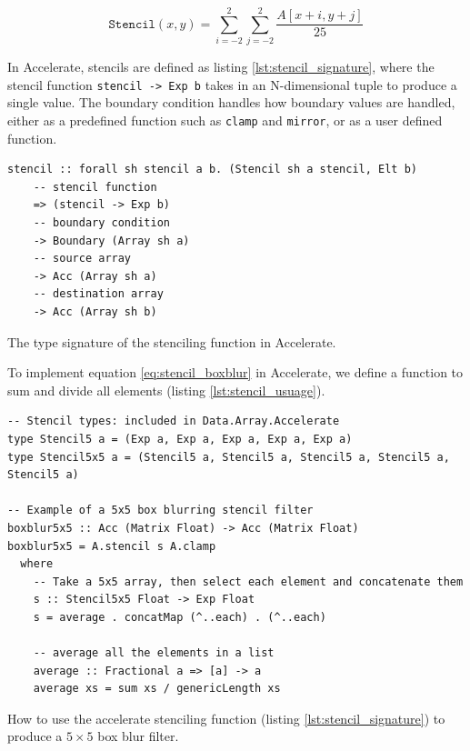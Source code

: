 \begin{equation}
    \texttt{Stencil}(x, y) = %
        \sum_{i=-2}^{2} %
        \sum_{j=-2}^{2} %
        \frac{ A[x + i, y + j] }{25}
    \label{eq:stencil_boxblur}
\end{equation}

In Accelerate, stencils are defined as listing \ref{lst:stencil_signature}, where the stencil function \texttt{stencil -> Exp b} takes in an N-dimensional tuple to produce a single value.
The boundary condition handles how boundary values are handled, either as a predefined function such as \texttt{clamp} and \texttt{mirror}, or as a user defined function.

\begin{listing}[H]
    \begin{verbatim}    
stencil :: forall sh stencil a b. (Stencil sh a stencil, Elt b)	 
    -- stencil function
    => (stencil -> Exp b)
    -- boundary condition
    -> Boundary (Array sh a)	
    -- source array
    -> Acc (Array sh a)	
    -- destination array
    -> Acc (Array sh b)	
    \end{verbatim}
    \caption{
        The type signature of the stenciling function in Accelerate.
    }
    \label{lst:stencil_signature}
\end{listing}

To implement equation \ref{eq:stencil_boxblur} in Accelerate, we define a function to sum and divide all elements (listing \ref{lst:stencil_usuage}).

\begin{listing}[H]
    \begin{verbatim}
-- Stencil types: included in Data.Array.Accelerate
type Stencil5 a = (Exp a, Exp a, Exp a, Exp a, Exp a) 
type Stencil5x5 a = (Stencil5 a, Stencil5 a, Stencil5 a, Stencil5 a, Stencil5 a) 

-- Example of a 5x5 box blurring stencil filter
boxblur5x5 :: Acc (Matrix Float) -> Acc (Matrix Float)
boxblur5x5 = A.stencil s A.clamp
  where
    -- Take a 5x5 array, then select each element and concatenate them
    s :: Stencil5x5 Float -> Exp Float
    s = average . concatMap (^..each) . (^..each)

    -- average all the elements in a list
    average :: Fractional a => [a] -> a
    average xs = sum xs / genericLength xs
    \end{verbatim}
    \caption{
        How to use the accelerate stenciling function (listing \ref{lst:stencil_signature}) to produce a $5 \times 5$ box blur filter.
    }
    \label{lst:stencil_usuage}
\end{listing}


